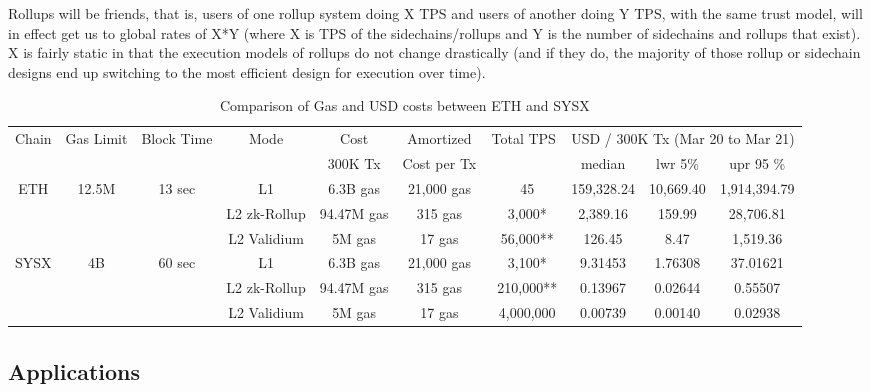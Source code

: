 \documentclass[peerreview]{ieeesyscoin}
\begin{document}
Rollups will be friends, that is, users of one rollup system doing X TPS and users of another doing Y TPS, with the same trust model, will in effect get us to global rates of X*Y (where X is TPS of the sidechains/rollups and Y is the number of sidechains and rollups that exist). X is fairly static in that the execution models of rollups do not change drastically (and if they do, the majority of those rollup or sidechain designs end up switching to the most efficient design for execution over time).


\begin{table}[h!]
\centering
\begin{tabular}{ |c|c|c|c|c|c|c|c|c|c|   } 
\hline
Chain & Gas  Limit & Block Time & Mode & Cost  & Amortized  & Total TPS & \multicolumn{3}{|c|}{USD / 300K Tx (Mar 20 to Mar 21) } \\
 &  &  &  &  300K Tx  & Cost per Tx  &  & median & lwr 5\% &  upr 95 \% \\ 
\hline
\multirow{3}{*}{ETH} & \multirow{3}{*}{12.5M} & \multirow{3}{*}{13 sec} & L1 & 6.3B gas  & 21,000 gas  & ~45 & 159,328.24 & 10,669.40  & 1,914,394.79  \\ 
\multirow{3}{*}{} & \multirow{3}{*}{} & \multirow{3}{*}{} & L2 zk-Rollup & 94.47M gas  & 315 gas & ~3,000* & 2,389.16 & 159.99  & 28,706.81 \\ 
\multirow{3}{*}{} & \multirow{3}{*}{} & \multirow{3}{*}{} & L2 Validium  & 5M gas  & 17 gas & ~56,000** & 126.45 & 8.47  & 1,519.36 \\ 
\hline

\multirow{3}{*}{SYSX} & \multirow{3}{*}{4B} & \multirow{3}{*}{60 sec} & L1 & 6.3B gas  & 21,000 gas  & ~3,100*& 9.31453 & 1.76308 & 37.01621 \\ 
\multirow{3}{*}{} & \multirow{3}{*}{} & \multirow{3}{*}{} & L2 zk-Rollup & 94.47M gas  & 315 gas & ~210,000** & 0.13967 & 0.02644  & 0.55507 \\ 
\multirow{3}{*}{} & \multirow{3}{*}{} & \multirow{3}{*}{} & L2 Validium  & 5M gas  & 17 gas & ~4,000,000 & 0.00739 & 0.00140  & 0.02938 \\ 
\hline

\end{tabular}
\caption{Comparison of Gas and USD costs between ETH and SYSX}
\label{table:1}
\end{table}


\subsection{Applications}
\end{document}

